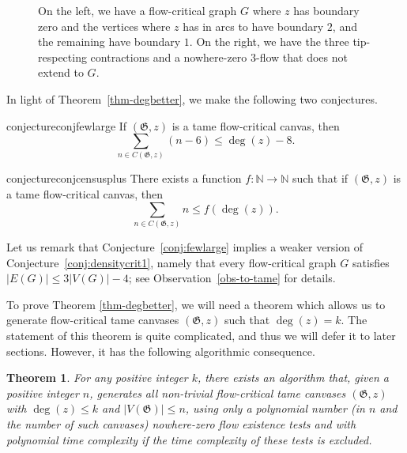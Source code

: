 \documentclass{article}
\newcommand\g{\mathfrak{G}}
\newtheorem{theorem}{Theorem}[section]
\begin{document}
\begin{figure}
\begin{center}
\caption{On the left, we have a flow-critical graph $G$ where $z$ has boundary zero and the vertices where $z$ has in arcs to have boundary $2$, and the remaining have boundary $1$. On the right, we have the three tip-respecting contractions and a nowhere-zero $3$-flow that does not extend to $G$.}\label{fig:tightnessexample1}
\end{center}
\end{figure}
In light of Theorem~\ref{thm-degbetter}, we make the following two conjectures.

\begin{restatable}{conjecture}{conjfewlarge}\label{conj:fewlarge}
If $(\g,z)$ is a tame flow-critical canvas, then
$$\sum_{n \in C(\g,z)} (n-6) \leq \deg(z) -8.$$
\end{restatable}

\begin{restatable}{conjecture}{conjcensusplus}
\label{conj-censusplus}
There exists a function $f: \mathbb{N} \rightarrow \mathbb{N}$ such that if $(\g,z)$ is a tame flow-critical canvas, then
$$\sum_{n \in C(\g,z)} n \leq f(\deg(z)).$$
\end{restatable}

Let us remark that Conjecture~\ref{conj:fewlarge} implies a weaker version of Conjecture~\ref{conj:densitycrit1}, namely
that every flow-critical graph $G$ satisfies $|E(G)| \leq 3|V(G)|-4$; see Observation~\ref{obs-to-tame} for details.

To prove Theorem \ref{thm-degbetter}, we will need a theorem which allows us to
generate flow-critical tame canvases $(\g,z)$ such that $\deg(z) =k$. The
statement of this theorem is quite complicated, and thus we will defer it to
later sections. However, it has the following algorithmic consequence.

\begin{theorem}
\label{informalgenerationtheorem1}
For any positive integer $k$, there exists an algorithm that, given a positive integer $n$, 
generates all non-trivial flow-critical tame canvases $(\g,z)$ with $\deg(z) \leq k$ and $|V(\g)|\le n$,
using only a polynomial number (in $n$ and the number of such canvases) nowhere-zero flow existence tests
and with polynomial time complexity if the time complexity of these tests is excluded.
\end{theorem}
\end{document}
